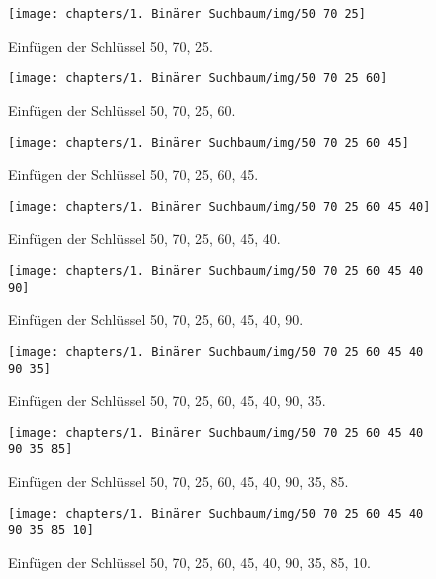 \begin{figure}[h]
    \centering
    \texttt{[image: chapters/1. Binärer Suchbaum/img/50 70 25]}
    \caption{Einfügen der Schlüssel 50, 70, 25.}
\end{figure}

\begin{figure}[h]
    \centering
    \texttt{[image: chapters/1. Binärer Suchbaum/img/50 70 25 60]}
    \caption{Einfügen der Schlüssel 50, 70, 25, 60.}
\end{figure}


\begin{figure}[h]
    \centering
    \texttt{[image: chapters/1. Binärer Suchbaum/img/50 70 25 60 45]}
    \caption{Einfügen der Schlüssel 50, 70, 25, 60, 45.}
\end{figure}

\begin{figure}[h]
    \centering
    \texttt{[image: chapters/1. Binärer Suchbaum/img/50 70 25 60 45 40]}
    \caption{Einfügen der Schlüssel 50, 70, 25, 60, 45, 40.}
\end{figure}


\begin{figure}[h]
    \centering
    \texttt{[image: chapters/1. Binärer Suchbaum/img/50 70 25 60 45 40 90]}
    \caption{Einfügen der Schlüssel 50, 70, 25, 60, 45, 40, 90.}
\end{figure}

\begin{figure}[h]
    \centering
    \texttt{[image: chapters/1. Binärer Suchbaum/img/50 70 25 60 45 40 90 35]}
    \caption{Einfügen der Schlüssel 50, 70, 25, 60, 45, 40, 90, 35.}
\end{figure}

\begin{figure}[h]
    \centering
    \texttt{[image: chapters/1. Binärer Suchbaum/img/50 70 25 60 45 40 90 35 85]}
    \caption{Einfügen der Schlüssel 50, 70, 25, 60, 45, 40, 90, 35, 85.}
\end{figure}

\begin{figure}[h]
    \centering
    \texttt{[image: chapters/1. Binärer Suchbaum/img/50 70 25 60 45 40 90 35 85 10]}
    \caption{Einfügen der Schlüssel 50, 70, 25, 60, 45, 40, 90, 35, 85, 10.}
\end{figure}